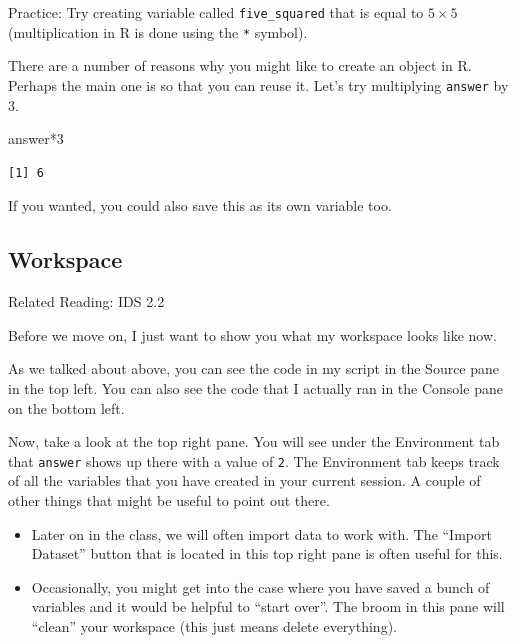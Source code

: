\documentclass[
  letterpaper,
  DIV=11,
  numbers=noendperiod]{scrreprt}
\newenvironment{Shaded}{\begin{snugshade}}{\end{snugshade}}
\newcommand{\DecValTok}[1]{\textcolor[rgb]{0.68,0.00,0.00}{#1}}
\newcommand{\NormalTok}[1]{\textcolor[rgb]{0.00,0.23,0.31}{#1}}
\newcommand{\SpecialCharTok}[1]{\textcolor[rgb]{0.37,0.37,0.37}{#1}}
\begin{document}
{Practice:} Try creating variable called \texttt{five\_squared} that is
equal to \(5 \times 5\) (multiplication in R is done using the
\texttt{*} symbol).

There are a number of reasons why you might like to create an object in
R. Perhaps the main one is so that you can reuse it. Let's try
multiplying \texttt{answer} by \(3\).

\begin{Shaded}
\begin{Highlighting}[]
\NormalTok{answer}\SpecialCharTok{*}\DecValTok{3}
\end{Highlighting}
\end{Shaded}

\begin{verbatim}
[1] 6
\end{verbatim}

If you wanted, you could also save this as its own variable too.

\subsection{Workspace}\label{workspace}

Related Reading: IDS 2.2

Before we move on, I just want to show you what my workspace looks like
now.

As we talked about above, you can see the code in my script in the
Source pane in the top left. You can also see the code that I actually
ran in the Console pane on the bottom left.

Now, take a look at the top right pane. You will see under the
Environment tab that \texttt{answer} shows up there with a value of
\texttt{2}. The Environment tab keeps track of all the variables that
you have created in your current session. A couple of other things that
might be useful to point out there.

\begin{itemize}
\item
  Later on in the class, we will often import data to work with. The
  ``Import Dataset'' button that is located in this top right pane is
  often useful for this.
\item
  Occasionally, you might get into the case where you have saved a bunch
  of variables and it would be helpful to ``start over''. The broom in
  this pane will ``clean'' your workspace (this just means delete
  everything).
\end{itemize}
\end{document}
